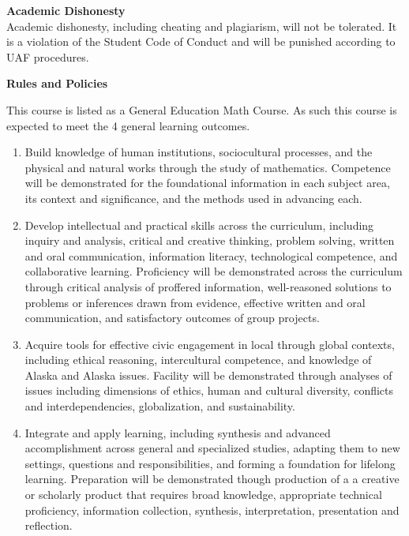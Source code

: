 \documentclass[12pt]{article}
\renewcommand{\emph}[1]{\textsf{\textbf{#1}}}
\newcommand{\localhead}[1]{\par\smallskip\textbf{#1}\nobreak\\}%
\def\heading#1{\localhead{\large\emph{#1}}}
\begin{document}
\vspace{.2in}

\heading{Academic Dishonesty}
Academic dishonesty, including cheating and plagiarism, will not
be tolerated.  It is a violation of the Student Code of Conduct
and will be punished according to UAF procedures.


\pagebreak

\heading{Rules and Policies}
\vskip -20pt


This course is listed as a General Education Math Course. As such this course is expected to meet the 4 general learning outcomes. 

\begin{enumerate}
\item Build knowledge of human institutions, sociocultural processes, and the physical and natural works through the study of mathematics.  Competence will be demonstrated for the foundational information in each subject area, its context and significance, and the methods used in advancing each.

\item Develop intellectual and practical skills across the curriculum, including inquiry and analysis, critical and creative thinking, problem solving, written and oral communication, information literacy, technological competence, and collaborative learning. Proficiency will be demonstrated across the curriculum through critical analysis of proffered information, well-reasoned solutions to problems or inferences drawn from evidence, effective written and oral communication, and satisfactory outcomes of group projects.

\item Acquire tools for effective civic engagement in local through global contexts, including ethical reasoning, intercultural competence, and knowledge of Alaska and Alaska issues.  Facility will be demonstrated through analyses of issues including dimensions of ethics, human and cultural diversity, conflicts and interdependencies, globalization, and sustainability.   

\item Integrate and apply learning, including synthesis and advanced accomplishment across general and specialized studies, adapting them to new settings, questions and responsibilities, and forming a foundation for lifelong learning. Preparation will be demonstrated though production of a a creative or scholarly product that requires broad knowledge, appropriate technical proficiency, information collection, synthesis, interpretation, presentation and reflection.
\end{enumerate}
\end{document}
